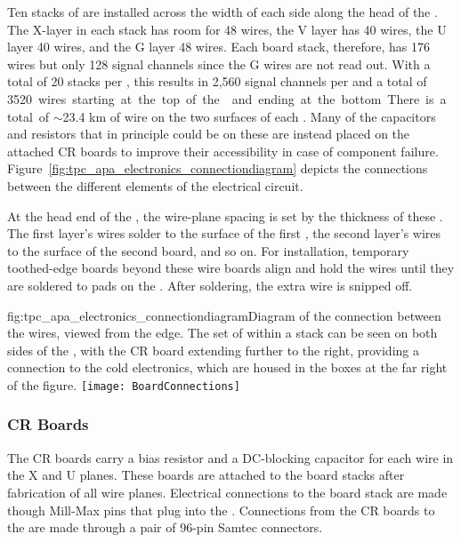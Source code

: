 Ten stacks of  are installed across the width of each side along the head of the  .  The X-layer  in each stack has room for 48 wires, the V layer has 40 wires, the U layer 40 wires, and the G layer 48 wires.  Each board stack, therefore, has 176 wires but only 128 signal channels since the G wires are not read out.  
With a total of 20 stacks per , this results in 2,560 signal channels per   and a total of \SI{3520} wires starting at the top of the   and ending at the bottom.  There is a total of $\sim$23.4 km of wire on the two surfaces of each  .  Many of the capacitors and resistors that in principle could be on these  are instead
placed on the attached CR boards to improve their accessibility in case of component failure.   Figure~\ref{fig:tpc_apa_electronics_connectiondiagram} depicts the connections between the different elements of the   electrical circuit. 

At the head end of the , the wire-plane spacing is set by the thickness of these .  The first layer's wires solder to the surface of the first , the second layer's wires to the surface of the second board, and so on.  For installation, temporary toothed-edge boards beyond these wire boards align and hold the wires until they are soldered to pads on the .  After soldering, the extra wire is snipped off. 

\begin{dunefigure}{fig:tpc_apa_electronics_connectiondiagram}{Diagram of the connection between the   wires, viewed from the   edge. The set of  within a stack can be seen on both sides of the  , with the CR board extending further to the right, providing a connection to the cold electronics, which are housed in the boxes at the far right of the figure. }
\texttt{[image: BoardConnections]}
\end{dunefigure}

\subsubsection{CR Boards}
\label{sec:crboards}

The CR boards carry a bias resistor and a DC-blocking capacitor for each wire in the X and U planes. These boards are attached to the board stacks
 after fabrication of all wire planes.  Electrical connections to the board stack are made though Mill-Max pins that plug into the . Connections from the CR boards to the  are made through a pair of 96-pin Samtec connectors.

